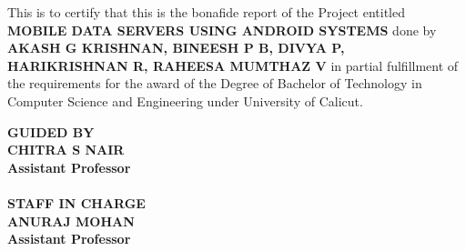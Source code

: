\documentclass[12pt, a4paper]{article}
\begin{document}
\begin{titlepage}
\begin{center}
\hspace{3cm}This \hspace{0.2mm}is \hspace{0.2mm} to \hspace{0.2mm} certify \hspace{0.2mm} that \hspace{0.2mm} this \hspace{0.2mm} is \hspace{0.2mm} the  \hspace{0.2mm} bonafide \hspace{0.2mm} report \hspace{0.2mm} of  \hspace{0.2mm}the \hspace{0.2mm} \hspace{0.2mm} Project entitled  \hspace{2mm}\textbf{MOBILE  \hspace{0.5mm} DATA \hspace{0.5mm} SERVERS  \hspace{0.5mm}USING  \hspace{0.5mm}ANDROID  \hspace{0.5mm} SYSTEMS} \hspace{2mm} done by
\textbf{AKASH G KRISHNAN, BINEESH P B, DIVYA P, HARIKRISHNAN R, RAHEESA MUMTHAZ V }  in partial fulfillment of the requirements for the award of the Degree of Bachelor of Technology in Computer Science and Engineering under University of Calicut.\\[1.6cm]
\hspace*{10mm}
\begin{minipage}{.55\textwidth}
\textcolor{red!40!orange}{\normalsize  \textbf{GUIDED BY}}\\[5mm]
{\normalsize \textbf{ CHITRA S NAIR}}\\
{\normalsize \textbf{ Assistant Professor}}\\
\\[1.5cm]
\textcolor{red!40!orange}{\normalsize  \textbf{STAFF IN CHARGE}}\\[5mm]
{\normalsize \textbf{ANURAJ MOHAN}}\\
{\normalsize \textbf{ Assistant Professor}}\\
\\

\end{minipage}
\end{center}
\end{titlepage}
\end{document}
